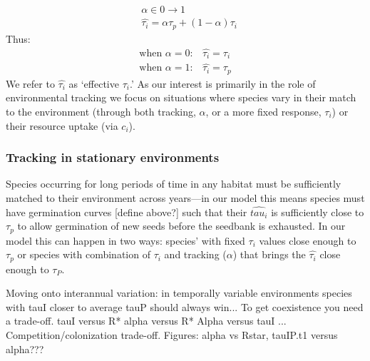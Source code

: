 \documentclass[11pt,letterpaper]{article}
\begin{document}
\begin{align}
& \alpha \in 0 \rightarrow 1
\\
&\hat{\tau_{i}} = \alpha \tau_{p} + (1-\alpha)\tau_{i}
\end{align}
\noindent Thus:
\begin{align*}
\text{when } \alpha = 0: & \hat{\tau_{i}}=\tau_{i}
\\
\text{when }  \alpha = 1: & \hat{\tau_{i}}=\tau_{p}
\end{align*}
We refer to $\hat{\tau_{i}}$ as `effective $\tau_i$.' As our interest is primarily in the role of environmental tracking we focus on situations where species vary in their match to the environment (through both tracking, $\alpha$, or a more fixed response, $\tau_i$) or their resource uptake (via $c_i$).

\subsubsection{Tracking in stationary environments}
Species occurring for long periods of time in any habitat must be sufficiently matched to their environment across years---in our model this means species must have germination curves [define above?] such that their $\hat{tau_{i}}$ is sufficiently close to $\tau_{p}$ to allow germination of new seeds before the seedbank is exhausted. In our model this can happen in two ways: species' with fixed $\tau_i$ values close enough to  $\tau_{p}$ or species with combination of $\tau_i$ and tracking ($\alpha$) that brings the $\hat{\tau_{i}}$ close enough to  $\tau_P$.

Moving onto interannual variation: in temporally variable environments species with tauI closer to average tauP should always win... 
To get coexistence you need a trade-off.
tauI versus R*
alpha versus R*
Alpha versus tauI ...
Competition/colonization trade-off.
Figures: alpha vs Rstar, tauIP.t1 versus alpha???

\newpage
\end{document}
